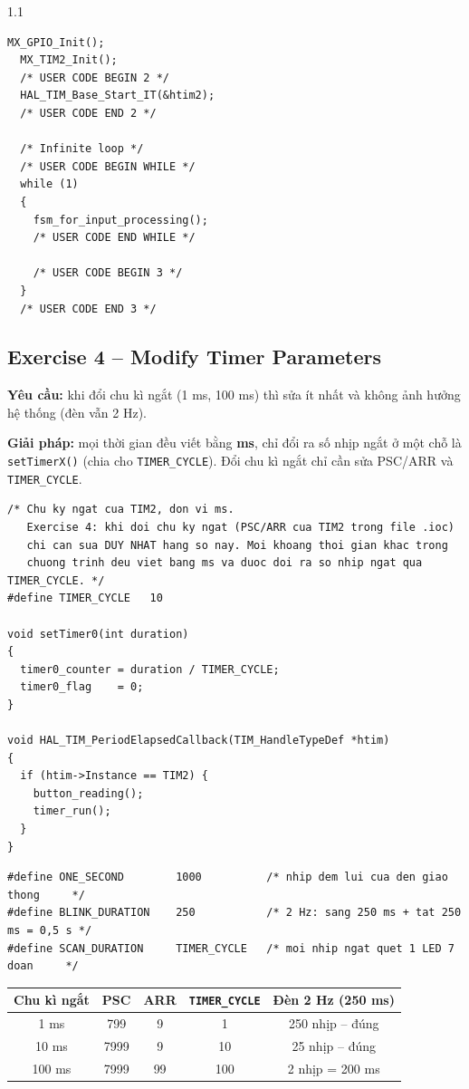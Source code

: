 \documentclass[a4paper,12pt]{article}
\begin{document}
\begin{spacing}{1.1}
\begin{lstlisting}[caption={Exercise 3 -- main.c (Program 1.9)}]
  MX_GPIO_Init();
  MX_TIM2_Init();
  /* USER CODE BEGIN 2 */
  HAL_TIM_Base_Start_IT(&htim2);
  /* USER CODE END 2 */

  /* Infinite loop */
  /* USER CODE BEGIN WHILE */
  while (1)
  {
    fsm_for_input_processing();
    /* USER CODE END WHILE */

    /* USER CODE BEGIN 3 */
  }
  /* USER CODE END 3 */
\end{lstlisting}

\subsection*{Exercise 4 -- Modify Timer Parameters}

\textbf{Yêu cầu:} khi đổi chu kì ngắt (1 ms, 100 ms) thì sửa ít nhất và không ảnh hưởng hệ thống (đèn vẫn 2 Hz).

\textbf{Giải pháp:} mọi thời gian đều viết bằng \textbf{ms}, chỉ đổi ra số nhịp ngắt ở một chỗ là
\texttt{setTimerX()} (chia cho \texttt{TIMER\_CYCLE}). Đổi chu kì ngắt chỉ cần sửa PSC/ARR và \texttt{TIMER\_CYCLE}.

\begin{lstlisting}[caption={Exercise 4 -- timer.h, timer.c}]
/* Chu ky ngat cua TIM2, don vi ms.
   Exercise 4: khi doi chu ky ngat (PSC/ARR cua TIM2 trong file .ioc)
   chi can sua DUY NHAT hang so nay. Moi khoang thoi gian khac trong
   chuong trinh deu viet bang ms va duoc doi ra so nhip ngat qua TIMER_CYCLE. */
#define TIMER_CYCLE   10

void setTimer0(int duration)
{
  timer0_counter = duration / TIMER_CYCLE;
  timer0_flag    = 0;
}

void HAL_TIM_PeriodElapsedCallback(TIM_HandleTypeDef *htim)
{
  if (htim->Instance == TIM2) {
    button_reading();
    timer_run();
  }
}
\end{lstlisting}

\begin{lstlisting}[caption={Exercise 4 -- cac thoi gian viet bang ms (input\_processing.c)}]
#define ONE_SECOND        1000          /* nhip dem lui cua den giao thong     */
#define BLINK_DURATION    250           /* 2 Hz: sang 250 ms + tat 250 ms = 0,5 s */
#define SCAN_DURATION     TIMER_CYCLE   /* moi nhip ngat quet 1 LED 7 doan     */
\end{lstlisting}

\begin{center}
\small
\begin{tabular}{|c|c|c|c|c|}
\hline
\textbf{Chu kì ngắt} & \textbf{PSC} & \textbf{ARR} & \texttt{TIMER\_CYCLE} & \textbf{Đèn 2 Hz (250 ms)} \\\hline
1 ms   & 799  & 9  & 1   & 250 nhịp -- đúng \\\hline
10 ms  & 7999 & 9  & 10  & 25 nhịp -- đúng \\\hline
100 ms & 7999 & 99 & 100 & 2 nhịp = 200 ms \\\hline
\end{tabular}
\end{center}


\end{spacing}
\end{document}
